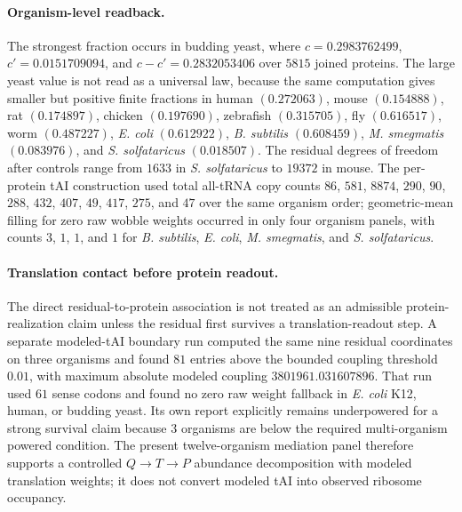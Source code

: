 \paragraph{Organism-level readback.}
The strongest fraction occurs in budding yeast, where $c=0.2983762499$, $c'=0.0151709094$, and $c-c'=0.2832053406$ over $5815$ joined proteins.  The large yeast value is not read as a universal law, because the same computation gives smaller but positive finite fractions in human $(0.272063)$, mouse $(0.154888)$, rat $(0.174897)$, chicken $(0.197690)$, zebrafish $(0.315705)$, fly $(0.616517)$, worm $(0.487227)$, \emph{E. coli} $(0.612922)$, \emph{B. subtilis} $(0.608459)$, \emph{M. smegmatis} $(0.083976)$, and \emph{S. solfataricus} $(0.018507)$.  The residual degrees of freedom after controls range from $1633$ in \emph{S. solfataricus} to $19372$ in mouse.  The per-protein tAI construction used total all-tRNA copy counts $86$, $581$, $8874$, $290$, $90$, $288$, $432$, $407$, $49$, $417$, $275$, and $47$ over the same organism order; geometric-mean filling for zero raw wobble weights occurred in only four organism panels, with counts $3$, $1$, $1$, and $1$ for \emph{B. subtilis}, \emph{E. coli}, \emph{M. smegmatis}, and \emph{S. solfataricus}.

\paragraph{Translation contact before protein readout.}
The direct residual-to-protein association is not treated as an admissible protein-realization claim unless the residual first survives a translation-readout step.  A separate modeled-tAI boundary run computed the same nine residual coordinates on three organisms and found $81$ entries above the bounded coupling threshold $0.01$, with maximum absolute modeled coupling $3801961.031607896$.  That run used $61$ sense codons and found no zero raw weight fallback in \emph{E. coli} K12, human, or budding yeast.  Its own report explicitly remains underpowered for a strong survival claim because $3$ organisms are below the required multi-organism powered condition.  The present twelve-organism mediation panel therefore supports a controlled $Q\to T\to P$ abundance decomposition with modeled translation weights; it does not convert modeled tAI into observed ribosome occupancy.


